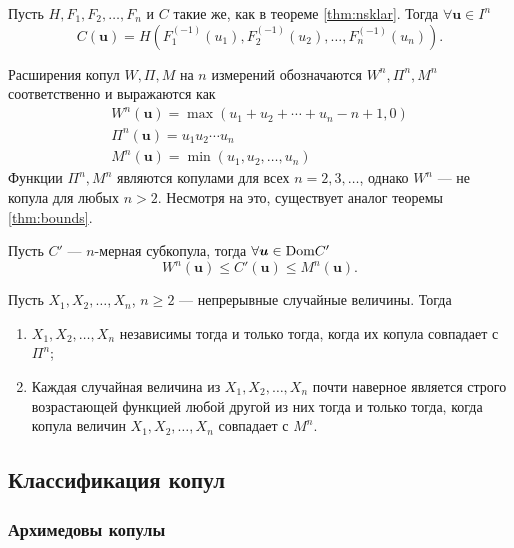 \begin{theorem}
	Пусть $H, F_1, F_2, \ldots, F_n$ и $C$ такие же, как в теореме \ref{thm:nsklar}. Тогда $\forall \bm{u} \in I^n$
\[
C(\bm{u}) = H(F_1^{(-1)}(u_1), F_2^{(-1)}(u_2), \ldots, F_n^{(-1)}(u_n)).
\]
\end{theorem}

Расширения копул $W, \Pi, M$ на $n$ измерений обозначаются $W^n, \Pi^n, M^n$ соответственно и выражаются как
\begin{gather}
	W^n(\bm{u}) = \max (u_1 + u_2 + \cdots + u_n - n + 1, 0) \\
	\Pi^n(\bm{u}) = u_1 u_2 \cdots u_n \\
	M^n(\bm{u}) = \min (u_1, u_2, \ldots, u_n)
\end{gather}
Функции $\Pi^n, M^n$ являются копулами для всех $n = 2, 3, \ldots$, однако $W^n$ --- не копула для любых $n > 2$. Несмотря на это, существует аналог теоремы \ref{thm:bounds}.

\begin{theorem}\label{thm:nbounds}
	Пусть $C'$ --- $n$-мерная субкопула, тогда $\forall \bm{u} \in \mathrm{Dom}{C'}$
	\begin{equation}\label{eq:nbounds}
		W^n(\bm{u}) \leqslant C'(\bm{u}) \leqslant M^n(\bm{u}).
	\end{equation}
\end{theorem}

\begin{theorem}
	Пусть $X_1, X_2, \ldots, X_n$, $n \geqslant 2$ --- непрерывные случайные величины. Тогда
	\begin{enumerate}
	\item $X_1, X_2, \ldots, X_n$ независимы тогда и только тогда, когда их копула совпадает с $\Pi^n$;
	\item Каждая случайная величина из $X_1, X_2, \ldots, X_n$ почти наверное является строго возрастающей функцией любой другой из них тогда и только тогда, когда копула величин $X_1, X_2, \ldots, X_n$ совпадает с $M^n$.
	\end{enumerate}
\end{theorem}

\subsection*{Классификация копул}
\subsubsection*{Архимедовы копулы}

